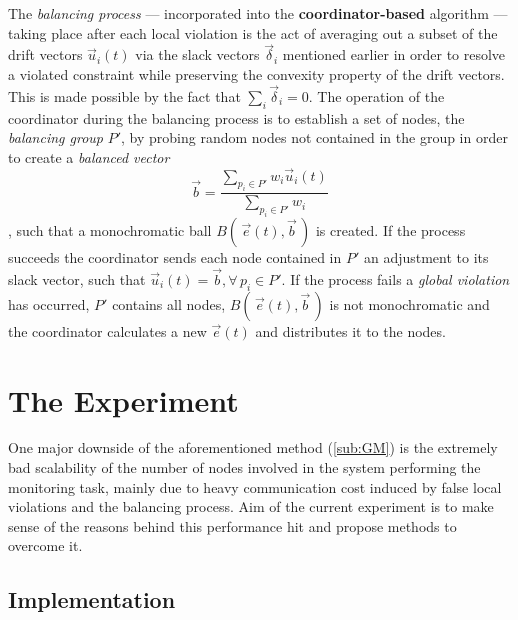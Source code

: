 \documentclass{article}
\begin{document}
			The \emph{balancing process} --- incorporated into the \textbf{coordinator-based} algorithm --- taking place after each local violation is the act of averaging out a  subset of the drift vectors $\vec{u}_i(t)$ via the slack vectors $\vec{\delta}_i$ mentioned earlier in order to resolve a violated constraint while preserving the convexity property of the drift vectors. This is made possible by the fact that $\sum\nolimits_{i} {\vec{\delta}_i=0}$. The operation of the coordinator during the balancing process is to establish a set of nodes, the \emph{balancing group} $P'$, by probing random nodes not contained in the group in order to create a \emph{balanced vector} $$\vec{b}=\dfrac{\sum\limits_{p_i\in P'}{w_i \vec{u}_i(t)}}{\sum\limits_{p_i\in P'}{w_i}}$$, such that a monochromatic ball $B\left(\,\vec{e}(t),\vec{b}\,\right)$ is created. If the process succeeds the coordinator sends each node contained in $P'$ an adjustment to its slack vector, such that $\vec{u}_i(t)=\vec{b}, \forall\, p_i\in P'$. If the process fails a \emph{global violation} has occurred, $P'$ contains all nodes, $B\left(\,\vec{e}(t),\vec{b}\,\right)$ is not monochromatic and the coordinator calculates a new $\vec{e}(t)$ and distributes it to the nodes.
		\newpage
		
	\section{The Experiment}			
		
		One major downside of the aforementioned method (\ref{sub:GM}) is the extremely bad scalability of the number of nodes involved in the system performing the monitoring task\cite{GarofalakisKerenSamoladas13}, mainly due to heavy communication cost induced by false local violations and the balancing process. Aim of the current experiment is to make sense of the reasons behind this performance hit and propose methods to overcome it.
	
	\subsection{Implementation}
	
\end{document}
